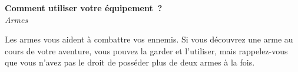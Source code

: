 \documentclass[10pt]{book}
\begin{document}
%
%
%
%
%
%

\begin{center}
  \textbf{\large Comment utiliser votre équipement~?}\\
  \textit{Armes}
\end{center}
Les armes vous aident à combattre vos ennemis. Si vous découvrez une arme au cours
de votre aventure, vous pouvez la garder et l'utiliser, mais rappelez-vous que vous
n'avez pas le droit de posséder plus de deux armes à la fois.\\
\end{document}
